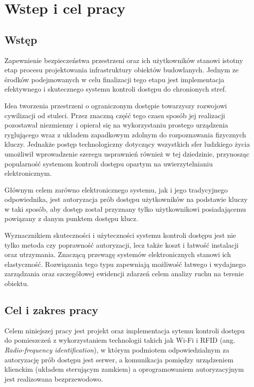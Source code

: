 \chapter{Wstep i cel pracy}
\label{chap:intro}

	\section{Wstęp}
		Zapewnienie bezpieczeństwa przestrzeni oraz ich użytkowników stanowi istotny etap procesu projektowania infrastruktury obiektów budowlanych. Jednym ze środków podejmowanych w celu finalizacji tego etapu jest implementacja efektywnego i skutecznego systemu kontroli dostępu do chronionych stref.

		Idea tworzenia przestrzeni o ograniczonym dostępie towarzyszy rozwojowi cywilizacji od stuleci. Przez znaczną część tego czasu sposób jej realizacji pozostawał niezmienny i opierał się na wykorzystaniu prostego urządzenia ryglującego wraz z układem zapadkowym zdolnym do rozpoznawania fizycznych kluczy. Jednakże postęp technologiczny dotyczący wszystkich sfer ludzkiego życia umożliwił wprowadzenie szeregu usprawnień również w tej dziedzinie, przynosząc popularność systemom kontroli dostępu opartym na uwierzytelnianiu elektronicznym.

		Głównym celem zarówno elektronicznego systemu, jak i jego tradycyjnego odpowiednika, jest autoryzacja prób dostępu użytkowników na podstawie kluczy w taki sposób, aby dostęp został przyznany tylko użytkownikowi posiadającemu powiązany z danym punktem dostępu klucz.

		Wyznacznikiem skuteczności i użyteczności systemu kontroli dostępu jest nie tylko metoda czy poprawność autoryzacji, lecz także koszt i łatwość instalacji oraz utrzymania. Znaczącą przewagę systemów elektronicznych stanowi ich elastyczność. Rozwiązania tego typu zapewniają możliwość łatwego i wydajnego zarządzania oraz szczegółowej ewidencji zdarzeń celem analizy ruchu na terenie obiektu.

	\section{Cel i zakres pracy}

		Celem niniejszej pracy jest projekt oraz implementacja sytemu kontroli dostępu do pomieszczeń z wykorzystaniem technologii takich jak Wi-Fi i RFID (ang. \textit{Radio-frequency identification}), w którym podmiotem odpowiedzialnym za autoryzację prób dostępu jest serwer, a komunikacja pomiędzy urządzeniem klienckim (układem sterującym zamkiem) a oprogramowaniem autoryzacyjnym jest realizowana bezprzewodowo.

